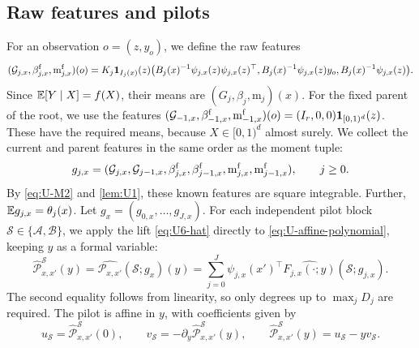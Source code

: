 \subsection*{Raw features and pilots}
For an observation $o=(z,y_o)$, we define the raw features
\begin{equation}\label{eq:Udef-rawfeatures}
 (\mathcal G_{j,x},\beta^{\rm f}_{j,x},\mathrm m^{\rm f}_{j,x})(o)
 =K_j\mathbf 1_{I_j(x)}(z)
   \bigl(B_j(x)^{-1}\psi_{j,x}(z)\psi_{j,x}(z)^\top,
         B_j(x)^{-1}\psi_{j,x}(z)y_o,
         B_j(x)^{-1}\psi_{j,x}(z)\bigr).
\end{equation}
Since $\mathbb E[Y\mid X]=f(X)$, their means are
$(G_j,\beta_j,\mathrm m_j)(x)$. For the fixed parent of the root, we use
the features
$(\mathcal G_{-1,x},\beta^{\rm f}_{-1,x},\mathrm m^{\rm f}_{-1,x})(o)
=(I_r,0,0)\mathbf 1_{[0,1)^d}(z)$. These have the required means, because
$X\in[0,1)^d$ almost surely. We collect the current and parent features
in the same order as the moment tuple:
\begin{equation}\label{eq:Udef-g}
 g_{j,x}=(\mathcal G_{j,x},\mathcal G_{j-1,x},
 \beta^{\rm f}_{j,x},\beta^{\rm f}_{j-1,x},
 \mathrm m^{\rm f}_{j,x},\mathrm m^{\rm f}_{j-1,x}),\qquad j\ge0.
\end{equation}
By \eqref{eq:U-M2} and \cref{lem:U1}, these known features are square
integrable. Further, $\mathbb E g_{j,x}=\theta_j(x)$.
Let $g_x=(g_{0,x},\ldots,g_{J,x})$.
For each independent pilot block
$\mathcal S\in\{\mathcal A,\mathcal B\}$, we apply the lift
\eqref{eq:U6-hat} directly to \eqref{eq:U-affine-polynomial}, keeping
$y$ as a formal variable:
\begin{equation}\label{eq:Udef-pilot}
 \widehat{\mathcal P}^{\mathcal S}_{x,x'}(y)
 =\widehat{\mathcal P_{x,x'}}(\mathcal S;g_x)(y)
 =\sum_{j=0}^J\psi_{j,x}(x')^\top
           \widehat{F_{j,x}(\cdot;y)}(\mathcal S;g_{j,x}).
\end{equation}
The second equality follows from linearity, so only degrees up to
$\max_jD_j$ are required. The pilot is affine in $y$, with coefficients given by
\begin{equation}\label{eq:U-affine-coefficients}
 u_{\mathcal S}=\widehat{\mathcal P}^{\mathcal S}_{x,x'}(0),\qquad
 v_{\mathcal S}=-\partial_y\widehat{\mathcal P}^{\mathcal S}_{x,x'}(y),
 \qquad \widehat{\mathcal P}^{\mathcal S}_{x,x'}(y)=u_{\mathcal S}-yv_{\mathcal S}.
\end{equation}

